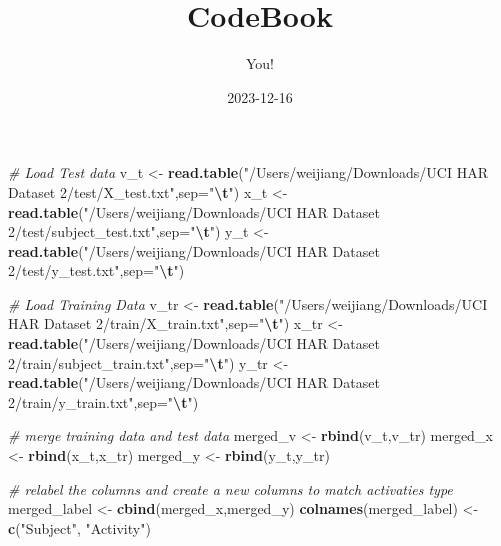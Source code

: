 \documentclass[
]{article}
\title{CodeBook}
\author{You!}
\date{2023-12-16}
\newenvironment{Shaded}{\begin{snugshade}}{\end{snugshade}}
\newcommand{\AttributeTok}[1]{\textcolor[rgb]{0.13,0.29,0.53}{#1}}
\newcommand{\CommentTok}[1]{\textcolor[rgb]{0.56,0.35,0.01}{\textit{#1}}}
\newcommand{\FunctionTok}[1]{\textcolor[rgb]{0.13,0.29,0.53}{\textbf{#1}}}
\newcommand{\NormalTok}[1]{#1}
\newcommand{\OtherTok}[1]{\textcolor[rgb]{0.56,0.35,0.01}{#1}}
\newcommand{\SpecialCharTok}[1]{\textcolor[rgb]{0.81,0.36,0.00}{\textbf{#1}}}
\newcommand{\StringTok}[1]{\textcolor[rgb]{0.31,0.60,0.02}{#1}}
\begin{document}
\maketitle

\begin{Shaded}
\begin{Highlighting}[]
\CommentTok{\# Load Test data}
\NormalTok{v\_t }\OtherTok{\textless{}{-}} \FunctionTok{read.table}\NormalTok{(}\StringTok{"/Users/weijiang/Downloads/UCI HAR Dataset 2/test/X\_test.txt"}\NormalTok{,}\AttributeTok{sep=}\StringTok{"}\SpecialCharTok{\textbackslash{}t}\StringTok{"}\NormalTok{)}
\NormalTok{x\_t }\OtherTok{\textless{}{-}} \FunctionTok{read.table}\NormalTok{(}\StringTok{"/Users/weijiang/Downloads/UCI HAR Dataset 2/test/subject\_test.txt"}\NormalTok{,}\AttributeTok{sep=}\StringTok{"}\SpecialCharTok{\textbackslash{}t}\StringTok{"}\NormalTok{)}
\NormalTok{y\_t }\OtherTok{\textless{}{-}} \FunctionTok{read.table}\NormalTok{(}\StringTok{"/Users/weijiang/Downloads/UCI HAR Dataset 2/test/y\_test.txt"}\NormalTok{,}\AttributeTok{sep=}\StringTok{"}\SpecialCharTok{\textbackslash{}t}\StringTok{"}\NormalTok{)}

\CommentTok{\# Load Training Data}
\NormalTok{v\_tr }\OtherTok{\textless{}{-}} \FunctionTok{read.table}\NormalTok{(}\StringTok{"/Users/weijiang/Downloads/UCI HAR Dataset 2/train/X\_train.txt"}\NormalTok{,}\AttributeTok{sep=}\StringTok{"}\SpecialCharTok{\textbackslash{}t}\StringTok{"}\NormalTok{)}
\NormalTok{x\_tr }\OtherTok{\textless{}{-}} \FunctionTok{read.table}\NormalTok{(}\StringTok{"/Users/weijiang/Downloads/UCI HAR Dataset 2/train/subject\_train.txt"}\NormalTok{,}\AttributeTok{sep=}\StringTok{"}\SpecialCharTok{\textbackslash{}t}\StringTok{"}\NormalTok{)}
\NormalTok{y\_tr }\OtherTok{\textless{}{-}} \FunctionTok{read.table}\NormalTok{(}\StringTok{"/Users/weijiang/Downloads/UCI HAR Dataset 2/train/y\_train.txt"}\NormalTok{,}\AttributeTok{sep=}\StringTok{"}\SpecialCharTok{\textbackslash{}t}\StringTok{"}\NormalTok{)}

\CommentTok{\# merge training data and test data}
\NormalTok{merged\_v }\OtherTok{\textless{}{-}} \FunctionTok{rbind}\NormalTok{(v\_t,v\_tr)}
\NormalTok{merged\_x }\OtherTok{\textless{}{-}} \FunctionTok{rbind}\NormalTok{(x\_t,x\_tr)}
\NormalTok{merged\_y }\OtherTok{\textless{}{-}} \FunctionTok{rbind}\NormalTok{(y\_t,y\_tr)}

\CommentTok{\# relabel the columns and create a new columns to match activaties type}
\NormalTok{merged\_label }\OtherTok{\textless{}{-}} \FunctionTok{cbind}\NormalTok{(merged\_x,merged\_y)}
\FunctionTok{colnames}\NormalTok{(merged\_label) }\OtherTok{\textless{}{-}} \FunctionTok{c}\NormalTok{(}\StringTok{"Subject"}\NormalTok{, }\StringTok{"Activity"}\NormalTok{)}


\end{Highlighting}
\end{Shaded}
\end{document}
